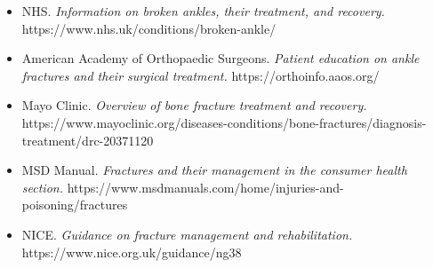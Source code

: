 \begin{itemize}
    \item NHS. \textit{Information on broken ankles, their treatment, and recovery.} https://www.nhs.uk/conditions/broken-ankle/
    \item American Academy of Orthopaedic Surgeons. \textit{Patient education on ankle fractures and their surgical treatment.} https://orthoinfo.aaos.org/
    \item Mayo Clinic. \textit{Overview of bone fracture treatment and recovery.} https://www.mayoclinic.org/diseases-conditions/bone-fractures/diagnosis-treatment/drc-20371120
    \item MSD Manual. \textit{Fractures and their management in the consumer health section.} https://www.msdmanuals.com/home/injuries-and-poisoning/fractures
    \item NICE. \textit{Guidance on fracture management and rehabilitation.} https://www.nice.org.uk/guidance/ng38
\end{itemize}
